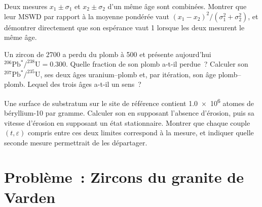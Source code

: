 \begin{exercise}[$\star\star\star$]\label{exo:b3:advanced-geochronology:10}
Deux mesures $x_1 \pm \sigma_1$ et $x_2 \pm \sigma_2$ d'un même âge sont
combinées. Montrer que leur MSWD par rapport à la moyenne pondérée vaut
$(x_1 - x_2)^2/(\sigma_1^2 + \sigma_2^2)$, et démontrer directement que son
espérance vaut 1 lorsque les deux mesurent le même âge.
\end{exercise}

\begin{exercise}[$\star\star\star$]\label{exo:b3:advanced-geochronology:11}
Un zircon de \qty{2700}{\Ma} a perdu du plomb à \qty{500}{\Ma} et présente aujourd'hui
$^{206}\mathrm{Pb}^*/^{238}\mathrm{U} = 0.300$. Quelle fraction de son plomb a-t-il
perdue~? Calculer son $^{207}\mathrm{Pb}^*/^{235}\mathrm{U}$, ses deux âges uranium--plomb
et, par itération, son âge plomb--plomb. Lequel des trois âges a-t-il un
sens~?
\end{exercise}

\begin{exercise}[$\star\star\star$]\label{exo:b3:advanced-geochronology:12}
Une surface de substratum sur le site de référence contient \num{1.0e6} atomes de
béryllium-10 par gramme. Calculer son  en supposant l'absence d'érosion, puis sa
vitesse d'érosion en supposant un état stationnaire. Montrer que chaque couple $(t, \varepsilon)$
compris entre ces deux limites correspond à la mesure, et indiquer quelle seconde
mesure permettrait de les départager.
\end{exercise}

\section{Problème~: Zircons du granite de Varden}

